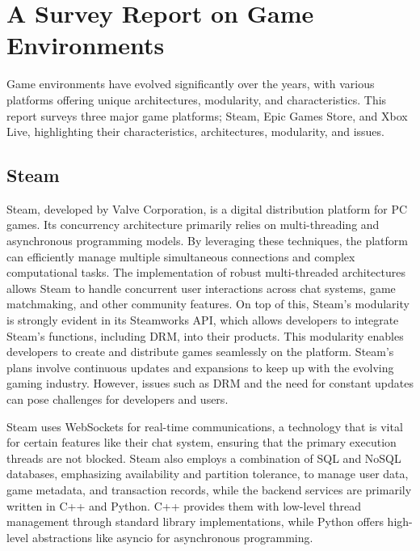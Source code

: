 \documentclass[]{final}
\begin{document}
\chapter{A Survey Report on Game Environments}

\label{survey}

Game environments have evolved significantly over the years, with various platforms
offering unique architectures, modularity, and characteristics. This report surveys
three major game platforms; Steam, Epic Games Store, and Xbox Live, highlighting
their characteristics, architectures, modularity, and issues.

\section{Steam}
Steam, developed by Valve Corporation, is a digital distribution platform
for PC games. Its concurrency architecture primarily relies on multi-threading and asynchronous
programming models. By leveraging these techniques, the platform can efficiently manage
multiple simultaneous connections and complex computational tasks. The implementation
of robust multi-threaded architectures allows Steam to handle concurrent user interactions
across chat systems, game matchmaking, and other community features. On top of this,
Steam's modularity is strongly evident in its Steamworks API, which allows developers to
integrate Steam's functions, including DRM, into their products.\cite{simmons_decoding_2023, noauthor_steamworks_nodate}
This modularity enables developers to create and distribute games seamlessly on the platform.
Steam's plans involve continuous updates and expansions to keep up with
the evolving gaming industry.\cite{noauthor_steam_nodate1} However, issues such as DRM and the need for
constant updates can pose challenges for developers and users\cite{noauthor_steam_nodate}.

Steam uses WebSockets for real-time communications, a technology that is vital
for certain features like their chat system, ensuring that the primary execution threads are not blocked.\cite{noauthor_isteamnetworkingsockets_nodate}
Steam also employs a combination of SQL and NoSQL databases\cite{simmons_decoding_2023, djundik_how_2017}, emphasizing availability
and partition tolerance, to manage user data, game metadata, and transaction records, while
the backend services are primarily written in C++ and Python.\cite{simmons_decoding_2023}  C++ provides them with low-level thread management through standard
library implementations, while Python offers high-level abstractions like asyncio
for asynchronous programming.
\end{document}
